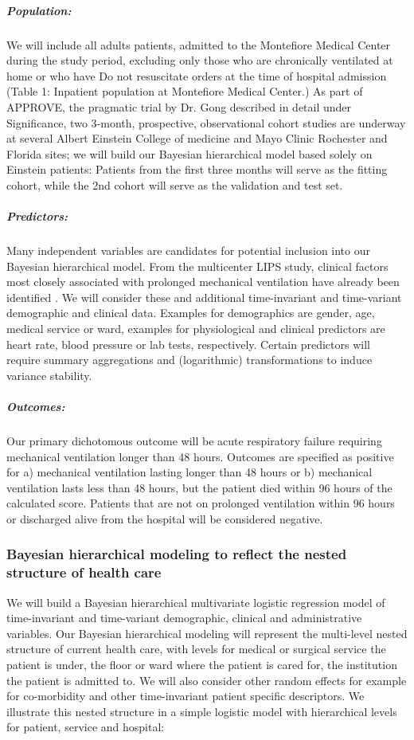 \documentclass[11pt,notitlepage]{article}
\begin{document}
\subparagraph*{Population:}
We will include all adults patients, admitted to the Montefiore Medical Center during the study period, excluding only those who are chronically ventilated at home or who have Do not resuscitate orders at the time of hospital admission (Table 1: Inpatient population at Montefiore Medical Center.) As part of APPROVE, the pragmatic trial by Dr. Gong described in detail under Significance, two 3-month, prospective, observational cohort studies are underway at several Albert Einstein College of medicine and Mayo Clinic Rochester and Florida sites; we will build our Bayesian hierarchical model based solely on Einstein patients: Patients from the first three months will serve as the fitting cohort, while the 2nd cohort will serve as the validation and test set.  

\subparagraph*{Predictors:}
Many independent variables are candidates for potential inclusion into our Bayesian hierarchical model. From the multicenter LIPS study, clinical factors most closely associated with prolonged mechanical ventilation have already been identified \cite{Herridge_12594312}. We will consider these and additional time-invariant and time-variant demographic and clinical data. Examples for demographics are gender, age, medical service or ward, examples for physiological and clinical predictors are heart rate, blood pressure or lab tests, respectively. Certain predictors will require summary aggregations and (logarithmic) transformations to induce variance stability.

\subparagraph*{Outcomes:}
Our primary dichotomous outcome will be acute respiratory failure requiring mechanical ventilation longer than 48 hours. Outcomes are specified as positive for a) mechanical ventilation lasting longer than 48 hours or b) mechanical ventilation lasts less than 48 hours, but the patient died within 96 hours of the calculated score. Patients that are not on prolonged ventilation within 96 hours or discharged alive from the hospital will be considered negative.

\subsubsection*{Bayesian hierarchical modeling to reflect the nested structure of health care}
We will build a Bayesian hierarchical multivariate logistic regression model of time-invariant and time-variant demographic, clinical and administrative variables. Our Bayesian hierarchical modeling will represent the multi-level nested structure of current health care, with levels for medical or surgical service the patient is under, the floor or ward where the patient is cared for, the institution the patient is admitted to. We will also consider other random effects for example for co-morbidity and other time-invariant patient specific descriptors. We illustrate this nested structure in a simple logistic model with hierarchical levels for patient, service and hospital: 
\end{document}
